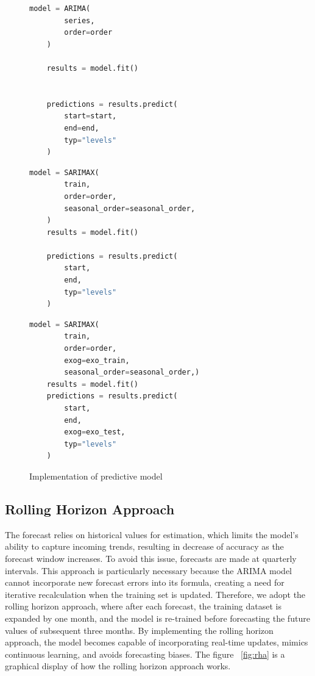 \documentclass[]{usiinfbachelorproject}
\begin{document}
\begin{figure}[htp!]
    \centering
    \begin{minipage}[t][0.3\textheight][t]{0.3\textwidth}
    \begin{lstlisting}[language=Python, caption={ARIMA}]
    model = ARIMA(
        series, 
        order=order
    )
        
    results = model.fit()


    predictions = results.predict(
        start=start, 
        end=end, 
        typ="levels"
    )
    \end{lstlisting}
    \end{minipage}%
    \hspace{0.03\textwidth}%
    \begin{minipage}[t][0.3\textheight][t]{0.3\textwidth}
    \begin{lstlisting}[language=Python, caption={SARIMA}]
    model = SARIMAX(
        train,
        order=order,
        seasonal_order=seasonal_order,
    )
    results = model.fit()

    predictions = results.predict(
        start, 
        end, 
        typ="levels"
    )
    \end{lstlisting}
    \end{minipage}%
    \hspace{0.03\textwidth}%
    \begin{minipage}[t][0.3\textheight][t]{0.3\textwidth}
    \begin{lstlisting}[language=Python, caption={SARIMAX}]
    model = SARIMAX(
        train,
        order=order,
        exog=exo_train,
        seasonal_order=seasonal_order,)
    results = model.fit()
    predictions = results.predict(
        start, 
        end, 
        exog=exo_test, 
        typ="levels"
    )
    \end{lstlisting}
    \end{minipage}
    \caption{Implementation of predictive model}
    \label{fig:autoarimaconfig}
\end{figure}

\subsection{Rolling Horizon Approach}
The forecast relies on historical values for estimation, which limits the model's ability to capture incoming trends, resulting in decrease of accuracy as the forecast window increases. To avoid this issue, forecasts are made at quarterly intervals. This approach is particularly necessary because the ARIMA model cannot incorporate new forecast errors into its formula, creating a need for iterative recalculation when the training set is updated. Therefore, we adopt the rolling horizon approach, where after each forecast, the training dataset is expanded by one month, and the model is re-trained before forecasting the future values of subsequent three months. By implementing the rolling horizon approach, the model becomes capable of incorporating real-time updates, mimics continuous learning, and avoids forecasting biases. The figure ~\ref{fig:rha} is a graphical display of how the rolling horizon approach works. \\
\end{document}

